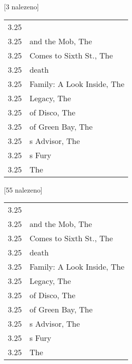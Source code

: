 \begin{table}[ht!]
\begin{tt}

\horizlina

\noindent
\begin{minipage}[t]{.5\textwidth}\vspace{0pt}
 [3 nalezeno]\vspace{5pt}

\begin{tabulary}{1.1\textwidth}{LL}
3.25 &  \\
3.25 &  and the Mob, The \\
3.25 &  Comes to Sixth St., The \\
3.25 &  death \\
3.25 &  Family: A Look Inside, The \\
3.25 &  Legacy, The \\
3.25 &  of Disco, The \\
3.25 &  of Green Bay, The \\
3.25 & s Advisor, The \\
3.25 & s Fury \\
3.25 &  The \\
\end{tabulary}
\end{minipage}
\begin{minipage}[t]{.5\textwidth}\vspace{0pt}
 [55 nalezeno]\vspace{5pt}

\begin{tabulary}{1.1\textwidth}{LL}
3.25 &  \\
3.25 &  and the Mob, The \\
3.25 &  Comes to Sixth St., The \\
3.25 &  death \\
3.25 &  Family: A Look Inside, The \\
3.25 &  Legacy, The \\
3.25 &  of Disco, The \\
3.25 &  of Green Bay, The \\
3.25 & s Advisor, The \\
3.25 & s Fury \\
3.25 &  The \\
\end{tabulary}
\end{minipage}


\end{tt}
\end{table}
